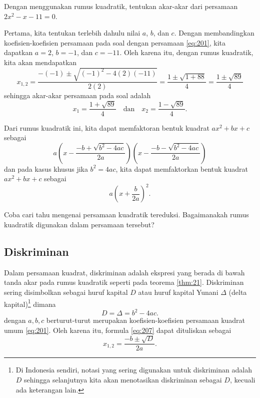 		\begin{contoh}
			Dengan menggunakan rumus kuadratik, tentukan akar-akar dari persamaan $ 2x^{2} - x - 11 = 0 $.
		\end{contoh}
		\begin{jawab}
			Pertama, kita tentukan terlebih dahulu nilai $ a $, $ b $, dan $ c $. Dengan membandingkan koefisien-koefisien persamaan pada soal dengan persamaan \ref{eq:201}, kita dapatkan $ a = 2 $, $ b = -1 $, dan $ c = -11 $. Oleh karena itu, dengan rumus kuadratik, kita akan mendapatkan
			\[ x_{1, 2} = \frac{-\left(-1\right) \pm \sqrt{\left(-1\right)^{2} - 4\left(2\right)\left(-11\right)}}{2\left(2\right)} = \frac{1 \pm \sqrt{1 + 88}}{4} = \frac{1 \pm \sqrt{89}}{4} \]
			sehingga akar-akar persamaan pada soal adalah
			\[ x_{1} = \frac{1 + \sqrt{89}}{4} \quad \mbox{dan} \quad x_{2} = \frac{1 - \sqrt{89}}{4}. \]
		\end{jawab}
		
		\par Dari rumus kuadratik ini, kita dapat memfaktoran bentuk kuadrat $ ax^{2} + bx + c $ sebagai
		\[ a\left(x - \frac{-b + \sqrt{b^{2} - 4ac}}{2a}\right)\left(x - \frac{-b - \sqrt{b^{2} - 4ac}}{2a}\right) \]
		dan pada kasus khusus jika $ b^{2} = 4ac $, kita dapat memfaktorkan bentuk kuadrat $ ax^{2} + bx + c $ sebagai
		\[ a\left(x + \frac{b}{2a}\right)^{2}. \]
		
		\begin{explbox}
			Coba cari tahu mengenai persamaan kuadratik tereduksi. Bagaimanakah rumus kuadratik digunakan dalam persamaan tersebut?
		\end{explbox}
	
\subsection{Diskriminan}

	Dalam persamaan kuadrat, diskriminan adalah ekspresi yang berada di bawah tanda akar pada rumus kuadratik seperti pada teorema \ref{thm:21}. Diskriminan sering disimbolkan sebagai huruf kapital $ D $ atau huruf kapital Yunani $ \Delta $ (delta kapital)\footnote{Di Indonesia sendiri, notasi yang sering digunakan untuk diskriminan adalah $ D $ sehingga selanjutnya kita akan menotasikan diskriminan sebagai $ D $, kecuali ada keterangan lain.} dimana
	\begin{equation} \label{eq:208}
		D = \Delta = b^{2} - 4ac.
	\end{equation}
	dengan $ a, b, c $ berturut-turut merupakan koefisien-koefisien persamaan kuadrat umum \ref{eq:201}. Oleh karena itu, formula \ref{eq:207} dapat dituliskan sebagai
	\begin{equation} \label{eq:209}
		x_{1, 2} = \frac{-b \pm \sqrt{D}}{2a}.
	\end{equation}
	
